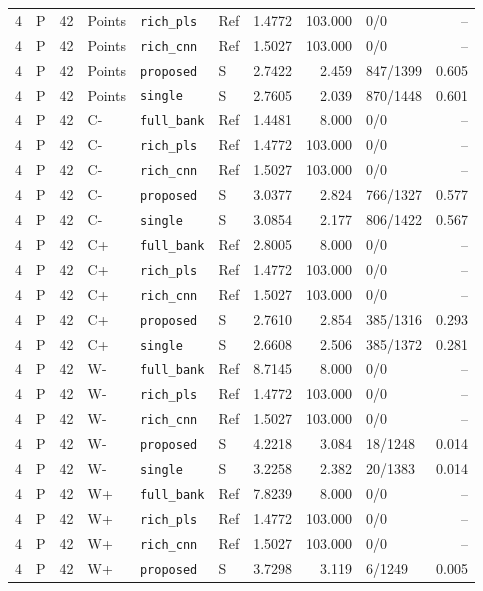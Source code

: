 \documentclass[10pt,a4paper]{article}
\begin{document}
\begin{landscape}
\begin{longtable}{rlrlllrrlr}
4 & P & 42 & Points & \texttt{rich\_pls} & Ref & 1.4772 & 103.000 & 0/0 & -- \\
4 & P & 42 & Points & \texttt{rich\_cnn} & Ref & 1.5027 & 103.000 & 0/0 & -- \\
4 & P & 42 & Points & \texttt{proposed} & S & 2.7422 & 2.459 & 847/1399 & 0.605 \\
4 & P & 42 & Points & \texttt{single} & S & 2.7605 & 2.039 & 870/1448 & 0.601 \\
4 & P & 42 & C- & \texttt{full\_bank} & Ref & 1.4481 & 8.000 & 0/0 & -- \\
4 & P & 42 & C- & \texttt{rich\_pls} & Ref & 1.4772 & 103.000 & 0/0 & -- \\
4 & P & 42 & C- & \texttt{rich\_cnn} & Ref & 1.5027 & 103.000 & 0/0 & -- \\
4 & P & 42 & C- & \texttt{proposed} & S & 3.0377 & 2.824 & 766/1327 & 0.577 \\
4 & P & 42 & C- & \texttt{single} & S & 3.0854 & 2.177 & 806/1422 & 0.567 \\
4 & P & 42 & C+ & \texttt{full\_bank} & Ref & 2.8005 & 8.000 & 0/0 & -- \\
4 & P & 42 & C+ & \texttt{rich\_pls} & Ref & 1.4772 & 103.000 & 0/0 & -- \\
4 & P & 42 & C+ & \texttt{rich\_cnn} & Ref & 1.5027 & 103.000 & 0/0 & -- \\
4 & P & 42 & C+ & \texttt{proposed} & S & 2.7610 & 2.854 & 385/1316 & 0.293 \\
4 & P & 42 & C+ & \texttt{single} & S & 2.6608 & 2.506 & 385/1372 & 0.281 \\
4 & P & 42 & W- & \texttt{full\_bank} & Ref & 8.7145 & 8.000 & 0/0 & -- \\
4 & P & 42 & W- & \texttt{rich\_pls} & Ref & 1.4772 & 103.000 & 0/0 & -- \\
4 & P & 42 & W- & \texttt{rich\_cnn} & Ref & 1.5027 & 103.000 & 0/0 & -- \\
4 & P & 42 & W- & \texttt{proposed} & S & 4.2218 & 3.084 & 18/1248 & 0.014 \\
4 & P & 42 & W- & \texttt{single} & S & 3.2258 & 2.382 & 20/1383 & 0.014 \\
4 & P & 42 & W+ & \texttt{full\_bank} & Ref & 7.8239 & 8.000 & 0/0 & -- \\
4 & P & 42 & W+ & \texttt{rich\_pls} & Ref & 1.4772 & 103.000 & 0/0 & -- \\
4 & P & 42 & W+ & \texttt{rich\_cnn} & Ref & 1.5027 & 103.000 & 0/0 & -- \\
4 & P & 42 & W+ & \texttt{proposed} & S & 3.7298 & 3.119 & 6/1249 & 0.005 \\

\end{longtable}
\end{landscape}
\end{document}
